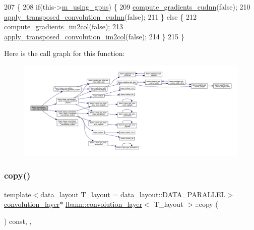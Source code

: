 \begin{DoxyCode}
207                              \{
208     \textcolor{keywordflow}{if}(this->\hyperlink{classlbann_1_1Layer_af7881cb5eff5207c15fa835d65462e8f}{m\_using\_gpus}) \{
209       \hyperlink{classlbann_1_1base__convolution__layer_ae46e6a975c443792c606817878dc4446}{compute\_gradients\_cudnn}(\textcolor{keyword}{false});
210       \hyperlink{classlbann_1_1base__convolution__layer_a130907ca7a8e3b6676bdd4186c788ef4}{apply\_transposed\_convolution\_cudnn}(\textcolor{keyword}{false});
211     \} \textcolor{keywordflow}{else} \{
212       \hyperlink{classlbann_1_1base__convolution__layer_a8cb0b4fb33f058ce6c211ebaf6a17f63}{compute\_gradients\_im2col}(\textcolor{keyword}{false});
213       \hyperlink{classlbann_1_1base__convolution__layer_a87fb2bf066a98052938e48a82dcd4fd2}{apply\_transposed\_convolution\_im2col}(\textcolor{keyword}{false});
214     \}
215   \}
\end{DoxyCode}
Here is the call graph for this function\+:\nopagebreak
\begin{figure}[H]
\begin{center}
\leavevmode
\includegraphics[width=350pt]{classlbann_1_1convolution__layer_a610f24f98b548434cd4d22419f47c7f0_cgraph}
\end{center}
\end{figure}
\mbox{\label{classlbann_1_1convolution__layer_ac2d126a93bc690a959daed54658aabd5}} 
\subsubsection{\texorpdfstring{copy()}{copy()}}
{\footnotesize\ttfamily template$<$data\+\_\+layout T\+\_\+layout = data\+\_\+layout\+::\+D\+A\+T\+A\+\_\+\+P\+A\+R\+A\+L\+L\+EL$>$ \\
\hyperlink{classlbann_1_1convolution__layer}{convolution\+\_\+layer}$\ast$ \hyperlink{classlbann_1_1convolution__layer}{lbann\+::convolution\+\_\+layer}$<$ T\+\_\+layout $>$\+::copy (\begin{DoxyParamCaption}{ }\end{DoxyParamCaption}) const\hspace{0.3cm}{\ttfamily [inline]}, {\ttfamily [override]}, {\ttfamily [virtual]}}

